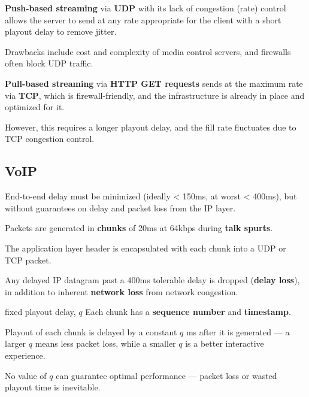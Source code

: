 \textbf{Push-based streaming} via \textbf{UDP} with its lack of congestion (rate) control
allows the server to send at any rate appropriate for the client with a short playout delay
to remove jitter.

Drawbacks include cost and complexity of media control servers, and firewalls often block
UDP traffic.

\textbf{Pull-based streaming} via \textbf{HTTP GET requests} sends at the maximum rate via \textbf{TCP},
which is firewall-friendly, and the infrastructure is already in place and optimized for it.

However, this requires a longer playout delay, and the fill rate fluctuates due to TCP congestion control.

\subsection{VoIP}
End-to-end delay must be minimized (ideally < 150ms, at worst < 400ms),
but without guarantees on delay and packet loss from the IP layer.

Packets are generated in \textbf{chunks} of 20ms at 64kbps during \textbf{talk spurts}.

The application layer header is encapsulated with each chunk into a UDP or TCP packet.

Any delayed IP datagram past a 400ms tolerable delay is dropped (\textbf{delay loss}),
in addition to inherent \textbf{network loss} from network congestion.

\begin{defn}{fixed playout delay, $q$}
    Each chunk has a \textbf{sequence number} and \textbf{timestamp}.

    Playout of each chunk is delayed by a constant $q$ ms after it is generated ---
    a larger $q$ means less packet loss, while a smaller $q$ is a better interactive experience.

    No value of $q$ can guarantee optimal performance --- packet loss or wasted playout time is inevitable.
\end{defn}

